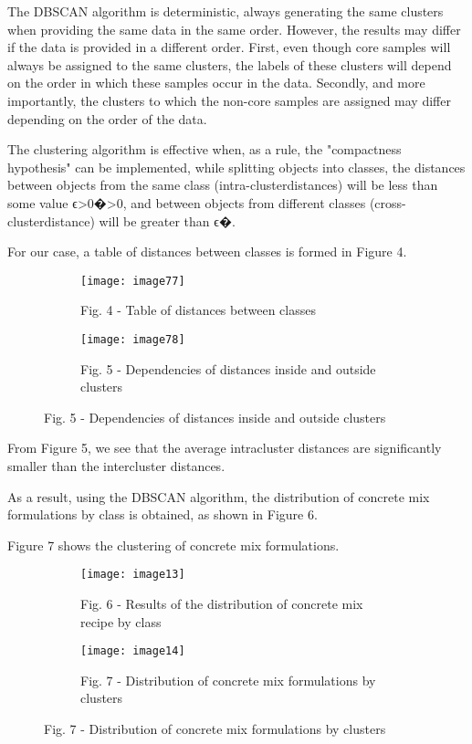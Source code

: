 The DBSCAN algorithm is deterministic, always generating the same
clusters when providing the same data in the same order. However, the
results may differ if the data is provided in a different order. First,
even though core samples will always be assigned to the same clusters,
the labels of these clusters will depend on the order in which these
samples occur in the data. Secondly, and more importantly, the clusters
to which the non-core samples are assigned may differ depending on the
order of the data.

The clustering algorithm is effective when, as a rule, the "compactness
hypothesis" can be implemented, while splitting objects into classes,
the distances between objects from the same class
(intra-clusterdistances) will be less than some value
ϵ\textgreater0�\textgreater0, and between objects from different classes
(cross-clusterdistance) will be greater than ϵ�.

For our case, a table of distances between classes is formed in Figure 4.

\begin{figure}[H]
\begin{subfigure}[b]{0.5\linewidth}
  \centering
  \texttt{[image: image77]}
  \caption*{Fig. 4 - Table of distances between classes}
\end{subfigure}
\begin{subfigure}[b]{0.5\linewidth}
  \centering
  \texttt{[image: image78]}
  \caption*{Fig. 5 - Dependencies of distances inside and outside clusters}
\end{subfigure}
\end{figure}

From Figure 5, we see that the average intracluster distances are
significantly smaller than the intercluster distances.


As a result, using the DBSCAN algorithm, the distribution of concrete
mix formulations by class is obtained, as shown in Figure 6.

Figure 7 shows the clustering of concrete mix formulations.

\begin{figure}[H]
\begin{subfigure}[b]{0.45\textwidth}
  \centering
  \texttt{[image: image13]}
  \caption*{Fig. 6 - Results of the distribution of concrete mix recipe by class}
\end{subfigure}
\hspace{0.05\textwidth}
\begin{subfigure}[b]{0.45\textwidth}
  \centering
  \texttt{[image: image14]}
  \caption*{Fig. 7 - Distribution of concrete mix formulations by clusters}
\end{subfigure}
\end{figure}

